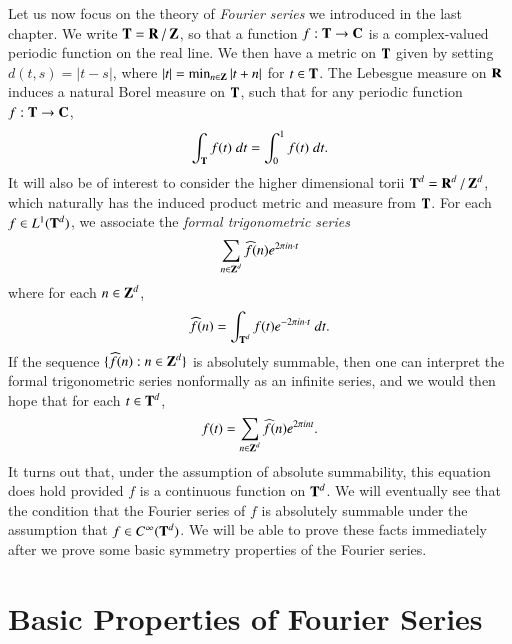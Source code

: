 Let us now focus on the theory of \emph{Fourier series} we introduced in the last chapter. We write $\operatorname{\mathbf{T}} = \operatorname{\mathbf{R}} / \operatorname{\mathbf{Z}}$, so that a function $f: \operatorname{\mathbf{T}} \to \operatorname{\mathbf{C}}$ is a complex-valued periodic function on the real line. We then have a metric on $\operatorname{\mathbf{T}}$ given by setting $d(t,s) = |t - s|$, where $|t| = \min_{n \in \operatorname{\mathbf{Z}}} |t + n|$ for $t \in \operatorname{\mathbf{T}}$. The Lebesgue measure on $\operatorname{\mathbf{R}}$ induces a natural Borel measure on $\operatorname{\mathbf{T}}$, such that for any periodic function $f: \operatorname{\mathbf{T}} \to \operatorname{\mathbf{C}}$,
%
\[ \int_{\operatorname{\mathbf{T}}} f(t)\; dt = \int_0^1 f(t)\; dt. \]
%
It will also be of interest to consider the higher dimensional torii $\operatorname{\mathbf{T}}^d = \operatorname{\mathbf{R}}^d / \operatorname{\mathbf{Z}}^d$, which naturally has the induced product metric and measure from $\operatorname{\mathbf{T}}$. For each $f \in L^1(\operatorname{\mathbf{T}}^d)$, we associate the \emph{formal trigonometric series}
%
\[ \sum_{n \in \operatorname{\mathbf{Z}}^d} \widehat{f}(n) e^{2 \pi i n \cdot t} \]
%
where for each $n \in \operatorname{\mathbf{Z}}^d$,
%
\[ \widehat{f}(n) = \int_{\operatorname{\mathbf{T}}^d} f(t) e^{-2\pi i n \cdot t}\; dt. \]
%
If the sequence $\{ \widehat{f}(n) : n \in \operatorname{\mathbf{Z}}^d \}$ is absolutely summable, then one can interpret the formal trigonometric series nonformally as an infinite series, and we would then hope that for each $t \in \operatorname{\mathbf{T}}^d$,
%
\[ f(t) = \sum_{n \in \operatorname{\mathbf{Z}}^d} \widehat{f}(n) e^{2 \pi i n t}. \]
%
It turns out that, under the assumption of absolute summability, this equation does hold provided $f$ is a continuous function on $\operatorname{\mathbf{T}}^d$. We will eventually see that the condition that the Fourier series of $f$ is absolutely summable under the assumption that $f \in C^\infty(\operatorname{\mathbf{T}}^d)$. We will be able to prove these facts immediately after we prove some basic symmetry properties of the Fourier series.

\section{Basic Properties of Fourier Series}


